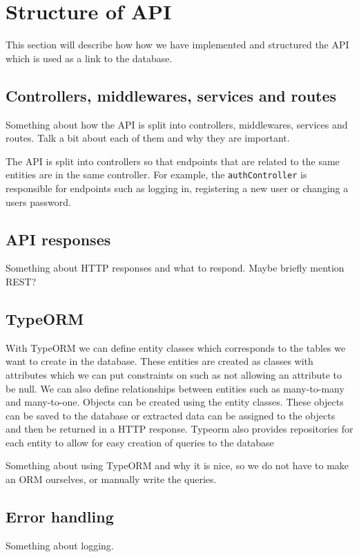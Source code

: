 \section{Structure of API}
This section will describe how how we have implemented and structured the API which is used as a link to the database.

\subsection{Controllers, middlewares, services and routes}
Something about how the API is split into controllers, middlewares, services and routes.
Talk a bit about each of them and why they are important.

The API is split into controllers so that endpoints that are related to the same entities are in the same controller. 
For example, the \texttt{authController} is responsible for endpoints such as logging in, registering a new user or changing a users password.



\subsection{API responses}
Something about HTTP responses and what to respond.
Maybe briefly mention REST?

\subsection{TypeORM}
With TypeORM we can define entity classes which corresponds to the tables we want to create in the database.
These entities are created as classes with attributes which we can put constraints on such as not allowing an attribute to be null. 
We can also define relationships between entities such as many-to-many and many-to-one.
Objects can be created using the entity classes. 
These objects can be saved to the database or extracted data can be assigned to the objects and then be returned in a HTTP response. 
Typeorm also provides repositories for each entity to allow for easy creation of queries to the database

Something about using TypeORM and why it is nice, so we do not have to make an ORM ourselves, or manually write the queries.

\subsection{Error handling}
Something about logging.
